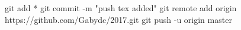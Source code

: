 git add *
git commit -m "push tex added"
git remote add origin https://github.com/Gabydc/2017.git
git push -u origin master

